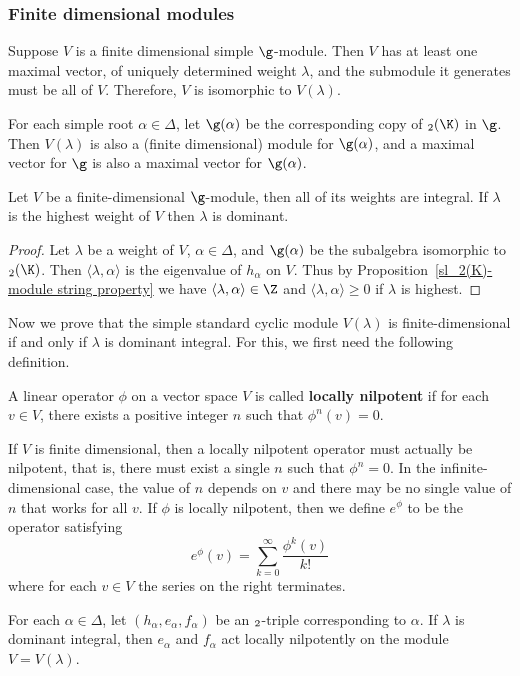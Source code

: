 \subsubsection{Finite dimensional modules}
Suppose $V$ is a finite dimensional simple $\g$-module. Then $V$ has at least one maximal vector, of uniquely determined weight $\lambda$, and the submodule it generates must be all of $V$. Therefore, $V$ is isomorphic to $V(\lambda)$.\par
For each simple root $\alpha\in\Delta$, let $\g(\alpha)$ be the corresponding copy of $\sl_2(\K)$ in $\g$. Then $V(\lambda)$ is also a (finite dimensional) module for $\g(\alpha)$, and a maximal vector for $\g$ is also a maximal vector for $\g(\alpha)$.
\begin{proposition}\label{Lie algebra simple module highese weight is dominant}
Let $V$ be a finite-dimensional $\g$-module, then all of its weights are integral. If $\lambda$ is the highest weight of $V$ then $\lambda$ is dominant.
\end{proposition}
\begin{proof}
Let $\lambda$ be a weight of $V$, $\alpha\in\Delta$, and $\g(\alpha)$ be the subalgebra isomorphic to $\sl_2(\K)$. Then $\langle\lambda,\alpha\rangle$ is the eigenvalue of $h_\alpha$ on $V$. Thus by Proposition~\ref{sl_2(K)-module string property} we have $\langle\lambda,\alpha\rangle\in\Z$ and $\langle\lambda,\alpha\rangle\geq 0$ if $\lambda$ is highest.
\end{proof}
Now we prove that the simple standard cyclic module $V(\lambda)$ is finite-dimensional if and only if $\lambda$ is dominant integral. For this, we first need the following definition.
\begin{definition}
A linear operator $\phi$ on a vector space $V$ is called \textbf{locally nilpotent} if for each $v\in V$, there exists a positive integer $n$ such that $\phi^n(v)=0$.
\end{definition}
If $V$ is finite dimensional, then a locally nilpotent operator must actually be nilpotent, that is, there must exist a single $n$ such that $\phi^n=0$. In the infinite-dimensional case, the value of $n$ depends on $v$ and there may be no single value of $n$ that works for all $v$. If $\phi$ is locally nilpotent, then we define $e^\phi$ to be the operator satisfying
\[e^\phi(v)=\sum_{k=0}^{\infty}\frac{\phi^k(v)}{k!}\]
where for each $v\in V$ the series on the right terminates.
\begin{proposition}\label{Lie algebra act locally nilpotent if dominant integral}
For each $\alpha\in\Delta$, let $(h_\alpha,e_\alpha,f_\alpha)$ be an $\sl_2$-triple corresponding to $\alpha$. If $\lambda$ is dominant integral, then $e_\alpha$ and $f_\alpha$ act locally nilpotently on the module $V=V(\lambda)$.
\end{proposition}
